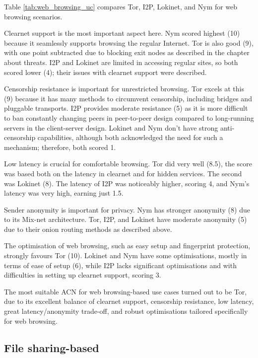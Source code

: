Table \ref{tab:web_browsing_uc} compares Tor, I2P, Lokinet, and Nym for web browsing scenarios.

Clearnet support is the most important aspect here. Nym scored highest (10) because it seamlessly supports browsing the regular Internet. Tor is also good (9), with one point subtracted due to blocking exit nodes as described in the chapter about threats. I2P and Lokinet are limited in accessing regular sites, so both scored lower (4); their issues with clearnet support were described.

Censorship resistance is important for unrestricted browsing. Tor excels at this (9) because it has many methods to circumvent censorship, including bridges and pluggable transports. I2P provides moderate resistance (5) as it is more difficult to ban constantly changing peers in peer-to-peer design compared to long-running servers in the client-server design. Lokinet and Nym don't have strong anti-censorship capabilities, although both acknowledged the need for such a mechanism; therefore, both scored 1.

Low latency is crucial for comfortable browsing. Tor did very well (8.5), the score was based both on the latency in clearnet and for hidden services. The second was Lokinet (8). The latency of I2P was noticeably higher, scoring 4, and Nym’s latency was very high, earning just 1.5.

Sender anonymity is important for privacy. Nym has stronger anonymity (8) due to its Mix-net architecture. Tor, I2P, and Lokinet have moderate anonymity (5) due to their onion routing methods as described above.

The optimisation of web browsing, such as easy setup and fingerprint protection, strongly favours Tor (10). Lokinet and Nym have some optimisations, mostly in terms of ease of setup (6), while I2P lacks significant optimisations and with difficulties in setting up clearnet support, scoring 3.

The most suitable ACN for web browsing-based use cases turned out to be Tor, due to its excellent balance of clearnet support, censorship resistance, low latency, great latency/anonymity trade-off, and robust optimisations tailored specifically for web browsing. 

\subsection{File sharing-based}

